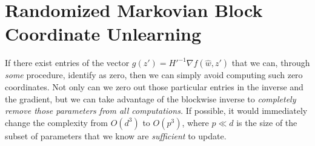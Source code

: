 


\section{Randomized Markovian  Block Coordinate Unlearning}
If there exist entries of the vector $g(z')= H'^{-1} \nabla f(\hat{w}, z')$ that we can, through {\em some} procedure, identify as zero, then we can simply avoid computing such zero coordinates. Not only can we zero out those particular entries in the inverse and the gradient, but we can take advantage of the blockwise inverse to {\em completely remove those parameters from all computations.} If possible, it would  immediately change the complexity from $O(d^3)$ to $O(p^3)$, where $p\ll d$ is the size of the subset of parameters that we know are \textit{sufficient} to update.

